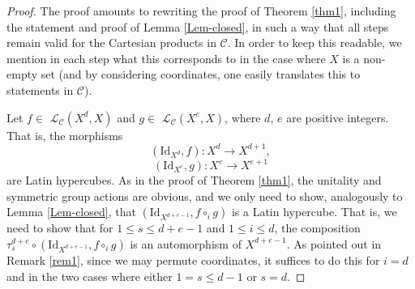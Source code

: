 \documentclass[10pt,a4paper]{amsart}
\def\CC{{\mathcal{C}}}    \def\OP{{\mathcal{O}P}}
\def\CL{{\mathcal{L}}}  \def\bCL{{\mathbf{L}}}
\def\Id{\mathrm{Id}}             \def\tenA{\otimes_A}
\begin{document}
\begin{proof}
The proof amounts to rewriting the proof of Theorem \ref{thm1}, including the statement and proof of
Lemma \ref{Lem-closed}, in such a way
that all steps remain valid for the Cartesian products in $\CC$.  In order to keep
this readable, we mention in each step what this corresponds to in the case where
$X$ is a non-empty set (and by considering coordinates, one easily translates this
to statements in $\CC$). 

\medskip
Let $f\in$ $\CL_\CC(X^d,X)$ and $g\in$ $\CL_\CC(X^e,X)$, where
$d$, $e$ are positive integers. That is, the morphisms
$$(\Id_{X^d}, f) : X^d \to X^{d+1}, $$
$$(\Id_{X^e},g) : X^e \to X^{e+1}$$
are Latin hypercubes. 
As in the proof of Theorem \ref{thm1}, the unitality and symmetric group actions
are obvious, and we only need to show, analogously to Lemma \ref{Lem-closed}, 
that  $(\Id_{X^{d+e-1}}, f\circ_i g)$ is a Latin hypercube. That is, we need to show that for
$1\leq s\leq d+e-1$ and $1\leq i\leq d$, 
the composition $\tau^{d+e}_s \circ  (\Id_{X^{d+e-1}}, f\circ_i g)$
is an automorphism of $X^{d+e-1}$. As pointed out in Remark \ref{rem1}, since
we may permute coordinates, it suffices to do this for $i=d$ and  in the two cases where
either $1=s\leq d-1$ or $s=d$.


\end{proof}
\end{document}
